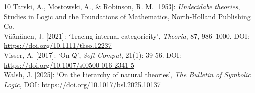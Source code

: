 \documentclass[a4paper,12pt]{amsart}
\theoremstyle{definition}
\numberwithin{equation}{section}
\begin{document}
\begin{thebibliography}{10}
Tarski, A., Mostowski, A., \& Robinson, R. M. [1953]: \emph{Undecidabe theories}, Studies in Logic and the Foundations of Mathematics, North-Holland Publishing Co.\\



V\"{a}\"{a}n\"{a}nen, J. [2021]: `Tracing internal categoricity', \emph{Theoria}, 87, 986–1000. DOI: \url{https://doi.org/10.1111/theo.12237}\\

Visser, A. [2017]: `On $\mathsf{Q}$', \emph{Soft Comput},   21(1): 39-56.  DOI: \url{ https://doi.org/10.1007/s00500-016-2341-5}\\

Walsh, J. [2025]:  `On the hierarchy of natural theories', \emph{The Bulletin of Symbolic Logic}, DOI: \url{https://doi.org/10.1017/bsl.2025.10137}

\end{thebibliography}
    
 
\end{document}
